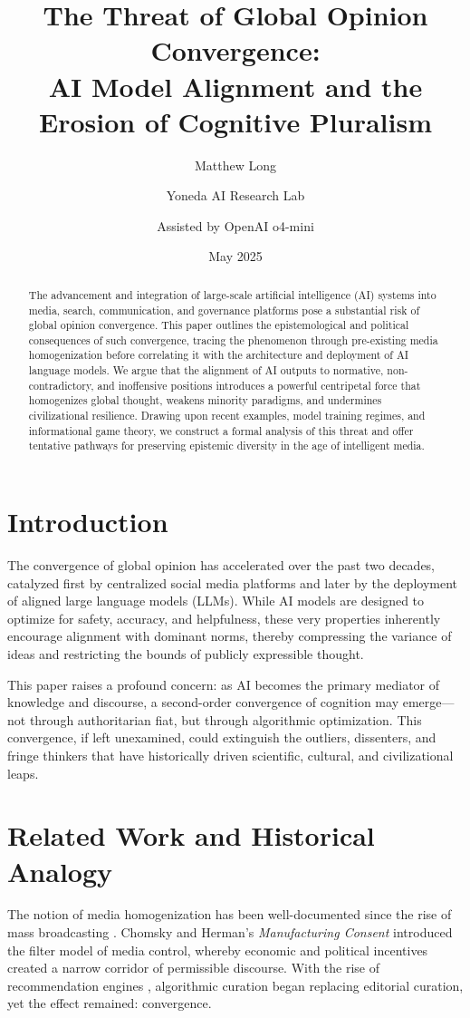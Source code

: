\documentclass[11pt]{article}
\title{\textbf{The Threat of Global Opinion Convergence:\\AI Model Alignment and the Erosion of Cognitive Pluralism}}
\author[1]{Matthew Long}
\author[1]{Yoneda AI Research Lab}
\author[2]{Assisted by OpenAI o4-mini}
\affil[1]{Yoneda AI, Department of Philosophical Systems and Computational Epistemology}
\affil[2]{OpenAI Foundation, Collaborative Research Initiative}
\date{May 2025}
\begin{document}
\maketitle

\begin{abstract}
The advancement and integration of large-scale artificial intelligence (AI) systems into media, search, communication, and governance platforms pose a substantial risk of global opinion convergence. This paper outlines the epistemological and political consequences of such convergence, tracing the phenomenon through pre-existing media homogenization before correlating it with the architecture and deployment of AI language models. We argue that the alignment of AI outputs to normative, non-contradictory, and inoffensive positions introduces a powerful centripetal force that homogenizes global thought, weakens minority paradigms, and undermines civilizational resilience. Drawing upon recent examples, model training regimes, and informational game theory, we construct a formal analysis of this threat and offer tentative pathways for preserving epistemic diversity in the age of intelligent media.
\end{abstract}

\onehalfspacing

\section{Introduction}
The convergence of global opinion has accelerated over the past two decades, catalyzed first by centralized social media platforms and later by the deployment of aligned large language models (LLMs). While AI models are designed to optimize for safety, accuracy, and helpfulness, these very properties inherently encourage alignment with dominant norms, thereby compressing the variance of ideas and restricting the bounds of publicly expressible thought.

This paper raises a profound concern: as AI becomes the primary mediator of knowledge and discourse, a second-order convergence of cognition may emerge—not through authoritarian fiat, but through algorithmic optimization. This convergence, if left unexamined, could extinguish the outliers, dissenters, and fringe thinkers that have historically driven scientific, cultural, and civilizational leaps.

\section{Related Work and Historical Analogy}
The notion of media homogenization has been well-documented since the rise of mass broadcasting \cite{mccluhan,herbert2002publicsphere}. Chomsky and Herman's \textit{Manufacturing Consent} \cite{chomsky1988manufacturing} introduced the filter model of media control, whereby economic and political incentives created a narrow corridor of permissible discourse. With the rise of recommendation engines \cite{pariser2011filterbubble}, algorithmic curation began replacing editorial curation, yet the effect remained: convergence.
\end{document}
